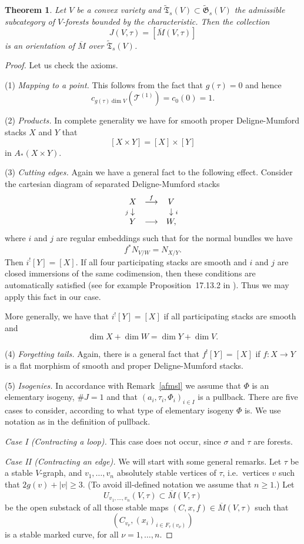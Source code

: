 \documentclass[11pt]{amsart}
\newtheorem{them}[prop]{Theorem}
\theoremstyle{definition}
\theoremstyle{remark}
\newenvironment{pf}{\begin{proof}}{\end{proof}}
\renewcommand{\tilde}{\widetilde}
\newcommand{\upst}{^{\ast}}
\newcommand{\upsh}{^{!}}
\newcommand{\lst}{_{\ast}}
\newcommand{\TT}{{\mathfrak{T}}}
\newcommand{\GG}{{\mathfrak{G}}}
\newcommand{\tT}{{\mathcal{T}}}
\newcommand{\ol}{\overline}
\newcommand{\ldiag}[1]
       {\makebox[0cm]{\({\scriptstyle#1}\downarrow\phantom{\scriptstyle#1}\)}}
\newcommand{\rdiag}[1]
       {\makebox[0cm]{\(\phantom{\scriptstyle#1}\downarrow{\scriptstyle#1}\)}}
\newcommand{\comdia}[9]{
\begin{array}{ccc}
#1 & \stackrel{#2}{\longrightarrow} & #3 \\
\ldiag{#4} & #5 & \rdiag{#6} \\
#7 & \stackrel{#8}{\longrightarrow} & #9
\end{array}}
\renewcommand{\t}{_{\tau}}
\theoremstyle{plain}
\theoremstyle{definition}
\theoremstyle{remark}
\begin{document}
\begin{them} \label{uosc}
Let \(V\) be a convex variety and \(\tilde{\TT}_s(V)\subset\tilde{\GG}_s(V)\) the
admissible subcategory of
\(V\)-forests bounded by the characteristic. Then the collection
\[
J(V,\tau)=[\ol{M}(V,\tau)]
\]
is an orientation of \(\ol{M}\) over \(\tilde{\TT}_s(V)\).
\end{them}
\begin{pf}
Let us check the axioms.

(1) {\em Mapping to a point. }  This follows from the fact that \(g(\tau)=0\) and
hence
\[
c_{g(\tau)\dim V}(\tT^{(1)})=c_0(0)=1.
\]

(2) {\em Products. } In complete generality we have for smooth proper
Deligne-Mumford stacks \(X\) and \(Y\) that
\[
[X\times Y]=[X]\times[Y]
\]
in \(A\lst(X\times Y)\).

(3) {\em Cutting edges. } Again we have a general fact to the following effect.
Consider the cartesian diagram of
separated Deligne-Mumford stacks
\[
\comdia{X}{f}{V}{j}{}{i}{Y}{}{W,}
\]
where \(i\) and \(j\) are regular embeddings such that for the normal bundles we
have
\[
f\upst N_{V/W}=N_{X/Y}.
\]
Then \(i\upsh[Y]=[X]\). If all four participating stacks are smooth and \(i\) and
\(j\) are closed immersions of the same
codimension, then these conditions are automatically satisfied (see for example
Proposition~17.13.2 in \cite{ega4}).
Thus we may apply this fact in our case.

More generally, we have that \(i\upsh[Y]=[X]\) if all participating stacks are
smooth and
\[
\dim X+\dim W=\dim Y +\dim V.
\]

(4) {\em Forgetting tails. } Again, there is a general fact that
\(f\upsh[Y]=[X]\) if \(f:X\rightarrow Y\) is a flat
morphism of smooth and proper Deligne-Mumford stacks.

(5) {\em Isogenies. } In accordance with Remark~\ref{afmsl} we assume that
\(\Phi\) is an elementary isogeny, \(\#J=1\) and
that \((a_i,\tau_i,\Phi_i)_{i\in I}\) is a pullback. There are five cases to
consider, according to what type of
elementary isogeny \(\Phi\) is. We use notation as in the definition of pullback.

{\em Case I (Contracting a loop). } This case does not occur, since \(\sigma\)
and \(\tau\) are forests.

{\em Case II (Contracting an edge). } We will start with some general remarks.
Let \(\tau\) be a stable \(V\)-graph, and
\(v_1,\ldots,v_n\) absolutely stable vertices of \(\tau\), i.e.\ vertices \(v\) such
that \(2g(v)+|v|\geq3\). (To avoid
ill-defined notation we assume that \(n\geq1\).) Let
\[
U_{v_1,\ldots,v_n}(V,\tau)\subset\ol{M}(V,\tau)
\]
be the open substack of all those stable maps \((C,x,f)\in\ol{M}(V,\tau)\) such
that
\[
(C_{v_{\nu}},(x_i)_{i\in
F\t(v_{\nu})})
\]
is a stable marked curve, for all \(\nu=1,\ldots,n\).


\end{pf}
\end{document}
